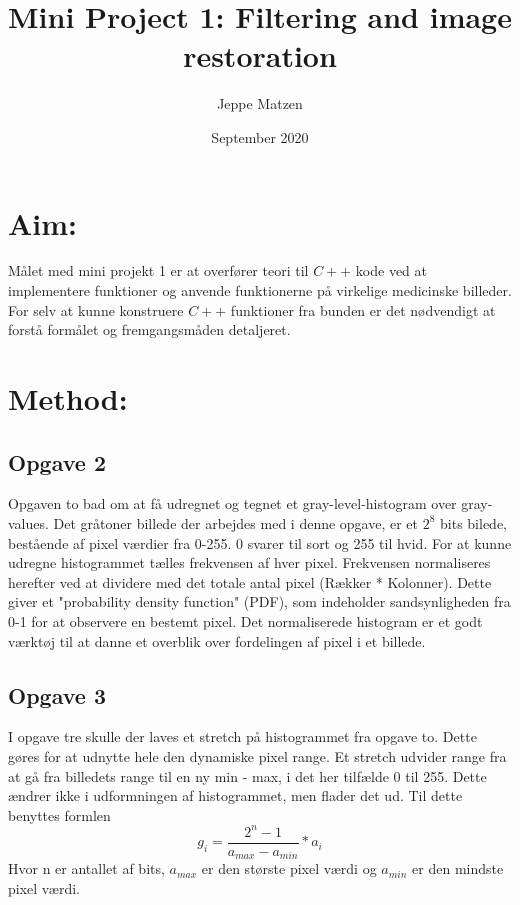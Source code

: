 \documentclass{article}
\title{Mini Project 1: Filtering and image restoration}
\author{Jeppe Matzen}
\date{September 2020}
\begin{document}
\lstset{style=mystyle}
\maketitle

\section{Aim:}

Målet med mini projekt 1 er at overfører teori til $C++$ kode ved at implementere funktioner og anvende funktionerne på virkelige medicinske billeder. \newline 
For selv at kunne konstruere $C++$ funktioner fra bunden er det nødvendigt at forstå formålet og fremgangsmåden detaljeret.     

\section{Method:}
\subsection{Opgave 2}
Opgaven to bad om at få udregnet og tegnet et gray-level-histogram over gray-values. \newline 
Det gråtoner billede der arbejdes med i denne opgave, er et $2^8$ bits bilede, bestående af pixel værdier fra 0-255. 0 svarer til sort og 255 til hvid. \newline 
For at kunne udregne histogrammet tælles frekvensen af hver pixel. Frekvensen normaliseres herefter ved at dividere med det totale antal pixel (Rækker * Kolonner). Dette giver et "probability density function" (PDF), som indeholder sandsynligheden fra 0-1 for at observere en bestemt pixel. Det normaliserede histogram er et godt værktøj til at danne et overblik over fordelingen af pixel i et billede. \newline 

\subsection{Opgave 3}
I opgave tre skulle der laves et stretch på histogrammet fra opgave to. Dette gøres for at udnytte hele den dynamiske pixel range. Et stretch udvider range fra at gå fra billedets range til en ny min - max, i det her tilfælde 0 til 255. Dette ændrer ikke i udformningen af histogrammet, men flader det ud. Til dette benyttes formlen $$g_i = \frac{2^n - 1}{a_{max} - a_{min}} * a_i $$ \newline Hvor n er antallet af bits, $a_{max}$ er den største pixel værdi og $a_{min}$ er den mindste pixel værdi. 
\end{document}
